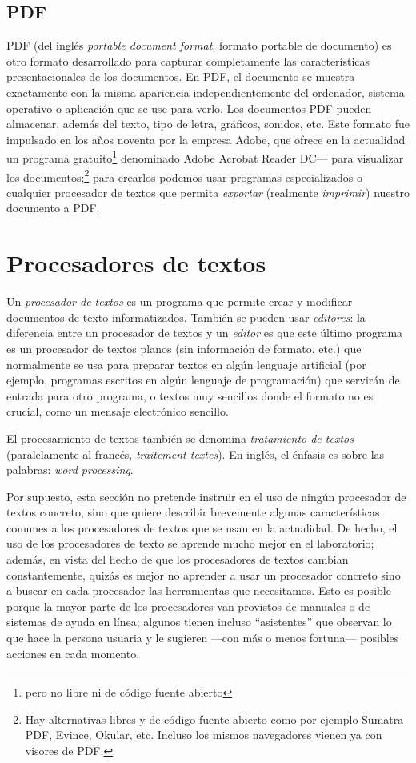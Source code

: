 \subsection{PDF} PDF (del inglés \emph{portable document format}, formato portable de documento) es otro formato desarrollado para capturar completamente las características presentacionales de los documentos. En PDF, el documento se muestra exactamente con la misma apariencia independientemente del ordenador, sistema operativo o aplicación que se use para verlo. Los documentos PDF pueden almacenar, además del texto, tipo de letra, gráficos, sonidos, etc. Este formato fue impulsado en los años noventa por la empresa Adobe, que ofrece en la actualidad un programa gratuito\footnote{pero no libre ni de código fuente abierto} denominado Adobe Acrobat Reader DC--- para visualizar los documentos;\footnote{Hay alternativas libres y de código fuente abierto como por ejemplo Sumatra PDF, Evince, Okular, etc. Incluso los mismos navegadores vienen ya con visores de PDF.} para crearlos podemos usar programas especializados o cualquier procesador de textos que permita \emph{exportar} (realmente \emph{imprimir}) nuestro documento a PDF. 

\section{Procesadores de textos}\label{ss:proctext} Un \emph{procesador de textos} es un programa que permite crear y modificar documentos de texto informatizados. También se  pueden usar \emph{editores}: la diferencia entre un procesador de textos y un \emph{editor} es que este último programa es un procesador de textos planos (sin información de formato, etc.) que normalmente se usa para preparar textos en algún lenguaje artificial (por ejemplo, programas escritos en algún lenguaje de programación) que servirán de entrada para otro programa, o textos muy sencillos donde el formato no es crucial, como un mensaje electrónico sencillo. 

El procesamiento de textos también se denomina \emph{tratamiento de textos} (paralelamente al francés, \emph{traitement textes}). En inglés, el énfasis es sobre las palabras: \emph{word processing}. 

Por supuesto, esta sección no pretende instruir en el uso de ningún procesador de textos concreto, sino que quiere describir brevemente algunas características comunes a los procesadores de textos que se usan en la actualidad. De hecho, el uso de los procesadores de texto se aprende mucho mejor en el laboratorio; además, en vista del hecho de que los procesadores de textos cambian constantemente, quizás es mejor no aprender a usar un procesador concreto sino a buscar en cada procesador las herramientas que necesitamos. Esto es posible porque la mayor parte de los procesadores van provistos de manuales o de sistemas de ayuda en línea; algunos tienen incluso ``asistentes'' que observan lo que hace la persona usuaria y le sugieren ---con más o menos fortuna--- posibles acciones en cada momento. 

